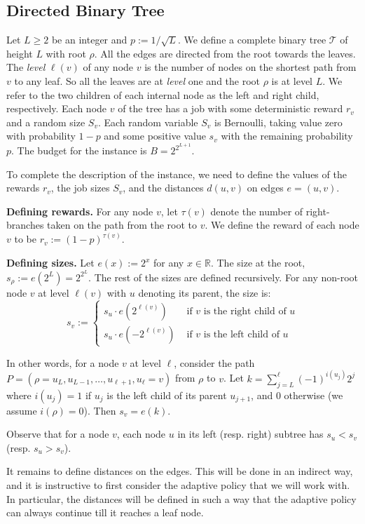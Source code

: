 \documentclass[11pt,letterpaper]{article}
\numberwithin{algorithm}{section}
\newcommand{\T}{\ensuremath{\mathcal{T}}\xspace}
\newcommand{\q}[1]{e\left(#1\right)}
\begin{document}
\subsection{Directed Binary Tree}

Let $L\ge 2$ be an integer and $p:=1/\sqrt{L}$. We define a complete binary tree \T of height $L$ with root $\rho$.
All the edges are directed from the root towards the leaves.
The {\em level} $\ell(v)$ of any node $v$ is the number of nodes on the shortest path from $v$ to any leaf. So all the leaves are at {\em level} one and the root $\rho$ is at level $L$. We refer to the two children of each internal node as the left and right child, respectively. Each node $v$ of the tree has a job with some deterministic reward $r_v$ and a random size $S_v$. Each random variable $S_v$ is Bernoulli, taking value zero with probability $1-p$ and some positive value $s_v$ with the remaining probability $p$. The budget for the instance is $B = 2^{2^{L+1}}$.

To complete the description of the instance, we need to define the values of the rewards $r_v$, the job sizes $S_v$, and the distances $d(u,v)$ on edges $e=(u,v)$.

{\bf Defining rewards.} For any node $v$, let $\tau(v)$ denote the number of right-branches taken on the path from the root to $v$. We define the reward of each node $v$ to be $r_v:=(1-p)^{\tau(v)}$.

{\bf Defining sizes.} Let $\q{x}:=2^{x}$ for any $x\in \mathbb{R}$. The size at the root, $s_\rho:=\q{2^L}=2^{2^L}$. The rest of the sizes are defined recursively. For any non-root node $v$ at level $\ell(v)$ with $u$ denoting its parent, the size is:
$$s_v:=\left\{
\begin{array}{ll}
s_u\cdot \q{2^{\ell(v)}} & \mbox{ if  $v$ is the right child of $u$}\\
s_u\cdot \q{-2^{\ell(v)}} & \mbox{ if  $v$ is the left child of $u$}
\end{array}\right.
$$

In other words, for a node $v$ at level $\ell$, consider the path $P=(\rho=u_L,u_{L-1},\ldots,u_{\ell+1},u_\ell=v)$  from $\rho$ to $v$. Let $k = \sum_{j=L}^{\ell} (-1)^{i(u_j)} 2^j$
where $i(u_j)=1$ if $u_j$ is the left child of its parent $u_{j+1}$, and $0$ otherwise (we assume $i(\rho)=0$).
Then $s_v = \q{k}$.

Observe that for a node $v$, each node $u$ in its left (resp. right) subtree has $s_u < s_v$ (resp. $s_u > s_v$).

It remains to define distances on the edges. This will be done in an indirect way, and it is instructive to first consider the adaptive policy that we will work with. In particular, the distances will be defined in such a way that the adaptive policy can always continue till it reaches a leaf node.
\end{document}
